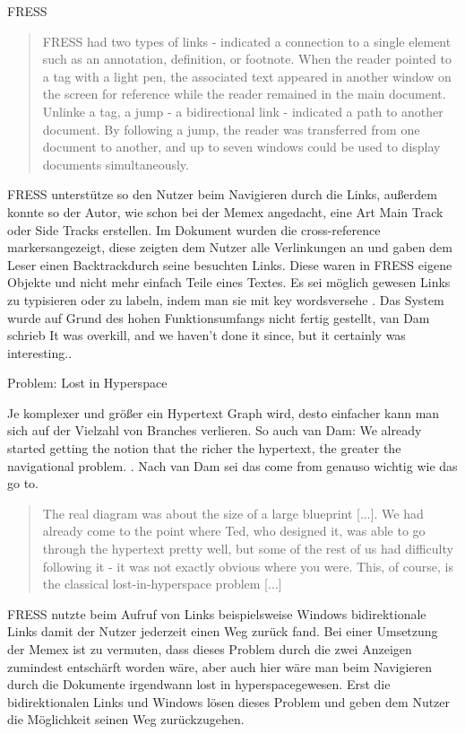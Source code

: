 \begin{section}{FRESS}
\begin{quote}
\glqq FRESS had two types of links - indicated a connection to a single element such as an annotation, definition, or footnote. When the reader pointed to a tag with a light pen, the associated text appeared in another window on the screen for reference while the reader remained in the main document. Unlinke a tag, a jump - a bidirectional link - indicated a path to another document. By following a jump, the reader was transferred from one document to another, and up to seven windows could be used to display documents simultaneously. \grqq{ }\cite[S.68]{GeorgeLandow1995}
\end{quote}

FRESS unterstütze so den Nutzer beim Navigieren durch die Links, außerdem konnte so der Autor, wie schon bei der Memex angedacht, eine Art Main Track oder Side Tracks erstellen. Im Dokument wurden die \glqq cross-reference markers\grqq{ }angezeigt, diese zeigten dem Nutzer alle Verlinkungen an und gaben dem Leser einen \glqq Backtrack\grqq{ }durch seine besuchten Links. Diese waren in FRESS eigene Objekte und nicht mehr einfach Teile eines Textes. Es sei möglich gewesen Links zu typisieren oder zu labeln, indem man sie mit \glqq key words\grqq{ }versehe \cite[S.891]{Dam1988}. Das System wurde auf Grund des hohen Funktionsumfangs nicht fertig gestellt, van Dam schrieb \glqq It was overkill, and we haven’t done it since, but it certainly was interesting.\grqq{ }\cite[S.891]{Dam1988}.

\end{section}

\begin{section}{Problem: Lost in Hyperspace}
\label{sec:lostInHyperspace}

Je komplexer und größer ein Hypertext Graph wird, desto einfacher kann man sich auf der Vielzahl von Branches verlieren. So auch van Dam: \glqq We already started getting the notion that the richer the hypertext, the greater the navigational problem. \grqq{ }. Nach van Dam sei das \glqq come from\grqq{ } genauso wichtig wie das \glqq go to\grqq{ }\cite{Dam1988}.

\begin{quote}
\glqq [...] The real diagram was about the size of a large blueprint [...]. We had already come to the point where Ted, who designed it, was able to go through the hypertext pretty well, but some of the rest of us had difficulty following it - it was not exactly obvious where you were. This, of course, is the classical lost-in-hyperspace problem [...]\grqq{ }\cite{Dam1988}
\end{quote}

FRESS nutzte beim Aufruf von Links beispielsweise Windows bidirektionale Links damit der Nutzer jederzeit einen Weg zurück fand. Bei einer Umsetzung der Memex ist zu vermuten, dass dieses Problem durch die zwei Anzeigen zumindest entschärft worden wäre, aber auch hier wäre man beim Navigieren durch die Dokumente irgendwann \glqq lost in hyperspace\grqq gewesen. Erst die bidirektionalen Links und Windows lösen dieses Problem und geben dem Nutzer die Möglichkeit seinen Weg zurückzugehen.

\end{section}

